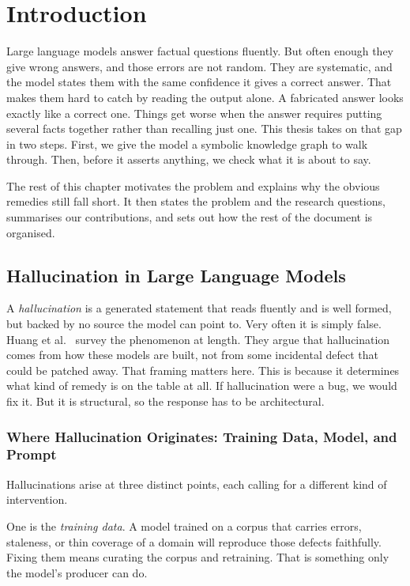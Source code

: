 \chapter{Introduction}\label{ch:intro}

Large language models answer factual questions fluently. But often enough they
give wrong answers, and those errors are not random. They are systematic, and
the model states them with the same confidence it gives a correct answer. That
makes them hard to catch by reading the output alone. A fabricated answer looks
exactly like a correct one. Things get worse when the answer requires putting
several facts together rather than recalling just one. This thesis takes on that
gap in two steps. First, we give the model a symbolic knowledge graph to walk
through. Then, before it asserts anything, we check what it is about to say.

The rest of this chapter motivates the problem and explains why the obvious
remedies still fall short. It then states the problem and the research
questions, summarises our contributions, and sets out how the rest of the
document is organised.

\section{Hallucination in Large Language Models}\label{sec:hallucination}

A \emph{hallucination} is a generated statement that reads
fluently and is well formed, but backed by no source the model can point to.
Very often it is simply false. Huang et al.~\cite{huang2025survey} survey the
phenomenon at length. They argue that hallucination comes from how these models
are built, not from some incidental defect that could be patched away. That
framing matters here. This is because it determines what kind of remedy is on
the table at all. If hallucination were a bug, we would fix it. But it is
structural, so the response has to be architectural.

\subsection{Where Hallucination Originates: Training Data, Model, and Prompt}

Hallucinations arise at three distinct points, each calling for a different kind
of intervention.

One is the \emph{training data}. A model trained on a corpus that carries
errors, staleness, or thin coverage of a domain will reproduce those defects
faithfully. Fixing them means curating the corpus and retraining. That is
something only the model's producer can do.

